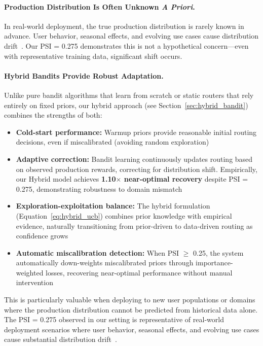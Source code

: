 \paragraph{Production Distribution Is Often Unknown \emph{A Priori}.} In real-world deployment, the true production distribution is rarely known in advance. User behavior, seasonal effects, and evolving use cases cause distribution drift~\cite{lu2018learning}. Our PSI = 0.275 demonstrates this is not a hypothetical concern---even with representative training data, significant shift occurs.

\paragraph{Hybrid Bandits Provide Robust Adaptation.} Unlike pure bandit algorithms that learn from scratch or static routers that rely entirely on fixed priors, our hybrid approach (see Section~\ref{sec:hybrid_bandit}) combines the strengths of both:
\begin{itemize}[leftmargin=*,noitemsep,topsep=2pt]
    \item \textbf{Cold-start performance:} Warmup priors provide reasonable initial routing decisions, even if miscalibrated (avoiding random exploration)
    \item \textbf{Adaptive correction:} Bandit learning continuously updates routing based on observed production rewards, correcting for distribution shift. Empirically, our Hybrid model achieves \textbf{1.10$\times$ near-optimal recovery} despite PSI = 0.275, demonstrating robustness to domain mismatch
    \item \textbf{Exploration-exploitation balance:} The hybrid formulation (Equation~\ref{eq:hybrid_ucb}) combines prior knowledge with empirical evidence, naturally transitioning from prior-driven to data-driven routing as confidence grows
    \item \textbf{Automatic miscalibration detection:} When PSI $\geq$ 0.25, the system automatically down-weights miscalibrated priors through importance-weighted losses, recovering near-optimal performance without manual intervention
\end{itemize}

\noindent This is particularly valuable when deploying to new user populations or domains where the production distribution cannot be predicted from historical data alone. The PSI = 0.275 observed in our setting is representative of real-world deployment scenarios where user behavior, seasonal effects, and evolving use cases cause substantial distribution drift~\cite{lu2018learning}.

